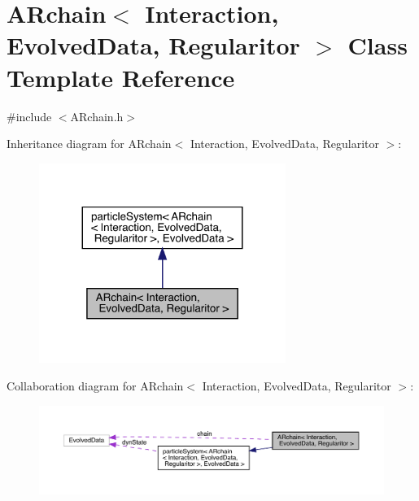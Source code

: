\hypertarget{class_a_rchain}{}\section{A\+Rchain$<$ Interaction, Evolved\+Data, Regularitor $>$ Class Template Reference}
\label{class_a_rchain}


{\ttfamily \#include $<$A\+Rchain.\+h$>$}



Inheritance diagram for A\+Rchain$<$ Interaction, Evolved\+Data, Regularitor $>$\+:\nopagebreak
\begin{figure}[H]
\begin{center}
\leavevmode
\includegraphics[width=227pt]{class_a_rchain__inherit__graph}
\end{center}
\end{figure}


Collaboration diagram for A\+Rchain$<$ Interaction, Evolved\+Data, Regularitor $>$\+:
\nopagebreak
\begin{figure}[H]
\begin{center}
\leavevmode
\includegraphics[width=350pt]{class_a_rchain__coll__graph}
\end{center}
\end{figure}
